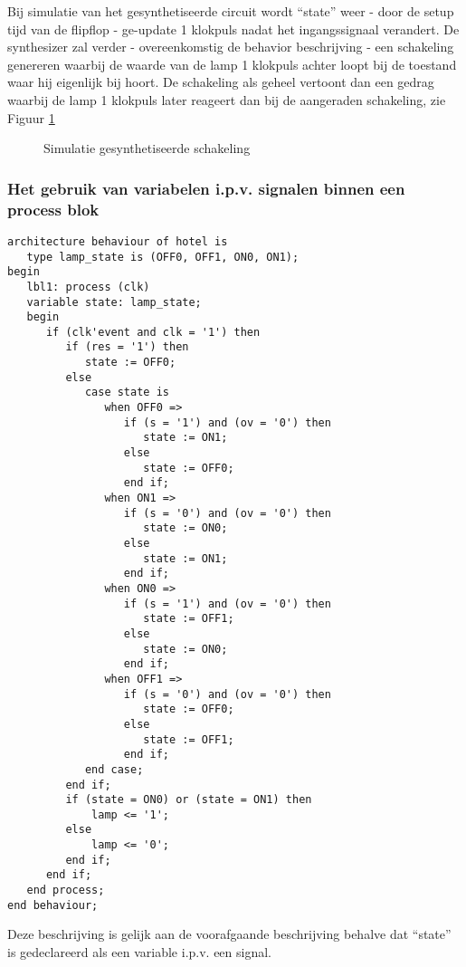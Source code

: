 Bij simulatie van het gesynthetiseerde circuit wordt ``state'' weer -
door de setup tijd van de flipflop -
ge-update 1 klokpuls nadat het ingangssignaal verandert.
De synthesizer zal verder - overeenkomstig de behavior beschrijving -
een schakeling genereren waarbij de waarde van de lamp
1 klokpuls achter loopt bij de toestand waar hij eigenlijk bij
hoort.
De schakeling als geheel vertoont dan een gedrag waarbij de
lamp 1 klokpuls later reageert dan bij de aangeraden schakeling, 
zie Figuur \ref{figuur:vhdlsim3}
\begin{figure}[bth]
\centerline{}
\caption{Simulatie gesynthetiseerde schakeling}
\label{figuur:vhdlsim3}
\end{figure}

\subsubsection{Het gebruik van variabelen i.p.v. signalen binnen een process blok}
\begin{small}
\begin{verbatim}
architecture behaviour of hotel is
   type lamp_state is (OFF0, OFF1, ON0, ON1);
begin
   lbl1: process (clk)
   variable state: lamp_state;
   begin
      if (clk'event and clk = '1') then
         if (res = '1') then
            state := OFF0;
         else 
            case state is
               when OFF0 =>
                  if (s = '1') and (ov = '0') then
                     state := ON1; 
                  else
                     state := OFF0;
                  end if;
               when ON1 =>
                  if (s = '0') and (ov = '0') then
                     state := ON0;
                  else
                     state := ON1;
                  end if;
               when ON0 =>
                  if (s = '1') and (ov = '0') then
                     state := OFF1; 
                  else
                     state := ON0; 
                  end if;
               when OFF1 =>
                  if (s = '0') and (ov = '0') then
                     state := OFF0;
                  else
                     state := OFF1;
                  end if;
            end case;
         end if;
         if (state = ON0) or (state = ON1) then
             lamp <= '1';
         else
             lamp <= '0';
         end if;
      end if;
   end process;
end behaviour;
\end{verbatim}
\end{small}
Deze beschrijving is gelijk aan de voorafgaande beschrijving
behalve dat ``state'' is gedeclareerd als een variable i.p.v.
een signal.

